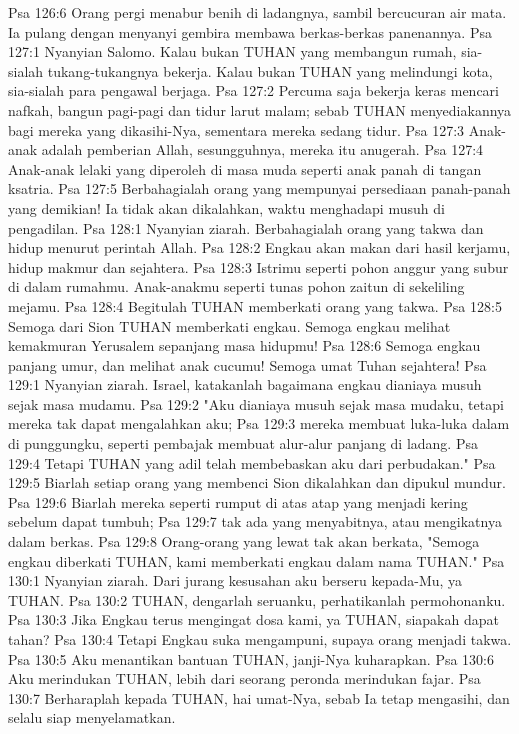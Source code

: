Psa 126:6  Orang pergi menabur benih di ladangnya, sambil bercucuran air mata. Ia pulang dengan menyanyi gembira membawa berkas-berkas panenannya.
Psa 127:1  Nyanyian Salomo. Kalau bukan TUHAN yang membangun rumah, sia-sialah tukang-tukangnya bekerja. Kalau bukan TUHAN yang melindungi kota, sia-sialah para pengawal berjaga.
Psa 127:2  Percuma saja bekerja keras mencari nafkah, bangun pagi-pagi dan tidur larut malam; sebab TUHAN menyediakannya bagi mereka yang dikasihi-Nya, sementara mereka sedang tidur.
Psa 127:3  Anak-anak adalah pemberian Allah, sesungguhnya, mereka itu anugerah.
Psa 127:4  Anak-anak lelaki yang diperoleh di masa muda seperti anak panah di tangan ksatria.
Psa 127:5  Berbahagialah orang yang mempunyai persediaan panah-panah yang demikian! Ia tidak akan dikalahkan, waktu menghadapi musuh di pengadilan.
Psa 128:1  Nyanyian ziarah. Berbahagialah orang yang takwa dan hidup menurut perintah Allah.
Psa 128:2  Engkau akan makan dari hasil kerjamu, hidup makmur dan sejahtera.
Psa 128:3  Istrimu seperti pohon anggur yang subur di dalam rumahmu. Anak-anakmu seperti tunas pohon zaitun di sekeliling mejamu.
Psa 128:4  Begitulah TUHAN memberkati orang yang takwa.
Psa 128:5  Semoga dari Sion TUHAN memberkati engkau. Semoga engkau melihat kemakmuran Yerusalem sepanjang masa hidupmu!
Psa 128:6  Semoga engkau panjang umur, dan melihat anak cucumu! Semoga umat Tuhan sejahtera!
Psa 129:1  Nyanyian ziarah. Israel, katakanlah bagaimana engkau dianiaya musuh sejak masa mudamu.
Psa 129:2  "Aku dianiaya musuh sejak masa mudaku, tetapi mereka tak dapat mengalahkan aku;
Psa 129:3  mereka membuat luka-luka dalam di punggungku, seperti pembajak membuat alur-alur panjang di ladang.
Psa 129:4  Tetapi TUHAN yang adil telah membebaskan aku dari perbudakan."
Psa 129:5  Biarlah setiap orang yang membenci Sion dikalahkan dan dipukul mundur.
Psa 129:6  Biarlah mereka seperti rumput di atas atap yang menjadi kering sebelum dapat tumbuh;
Psa 129:7  tak ada yang menyabitnya, atau mengikatnya dalam berkas.
Psa 129:8  Orang-orang yang lewat tak akan berkata, "Semoga engkau diberkati TUHAN, kami memberkati engkau dalam nama TUHAN."
Psa 130:1  Nyanyian ziarah. Dari jurang kesusahan aku berseru kepada-Mu, ya TUHAN.
Psa 130:2  TUHAN, dengarlah seruanku, perhatikanlah permohonanku.
Psa 130:3  Jika Engkau terus mengingat dosa kami, ya TUHAN, siapakah dapat tahan?
Psa 130:4  Tetapi Engkau suka mengampuni, supaya orang menjadi takwa.
Psa 130:5  Aku menantikan bantuan TUHAN, janji-Nya kuharapkan.
Psa 130:6  Aku merindukan TUHAN, lebih dari seorang peronda merindukan fajar.
Psa 130:7  Berharaplah kepada TUHAN, hai umat-Nya, sebab Ia tetap mengasihi, dan selalu siap menyelamatkan.
